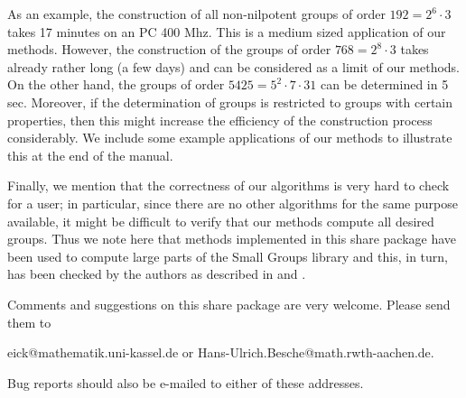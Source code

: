 As an example, the construction of all non-nilpotent groups of order 
$192 = 2^6 \cdot 3$ takes 17 minutes on an PC 400 Mhz. This is a medium 
sized application of our methods.  However, the construction of the groups
of order $768 = 2^8 \cdot 3$ takes already rather long (a few days) and 
can be considered as a limit of our methods. On the other hand, the 
groups of order $5425 = 5^2 \cdot 7 \cdot 31$ can be determined in 5 sec.
Moreover, if the determination of groups is restricted to groups
with certain properties, then this might increase the efficiency
of the construction process considerably. We include some example
applications of our methods to illustrate this at the end of the
manual.

Finally, we mention that the correctness of our algorithms is very
hard to check for a user; in particular, since there are no other
algorithms for the same purpose available, it might be difficult to
verify that our methods compute all desired groups. Thus we note here 
that methods implemented in this share package have been used to compute 
large parts of the Small Groups library and this, in turn, has been 
checked by the authors as described in \cite{BE99} and \cite{BE1000}.

Comments and suggestions on this share package are very welcome.
Please send them to 

\centerline{ eick@mathematik.uni-kassel.de or 
             Hans-Ulrich.Besche@math.rwth-aachen.de.}

Bug reports should also be e-mailed to either of these addresses.

